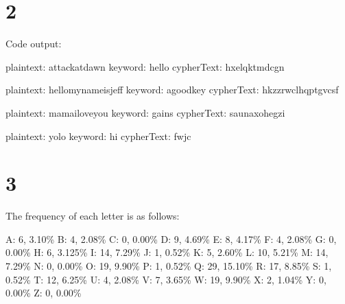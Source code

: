 \documentclass[a4paper]{article}
\begin{document}
\section*{2}



Code output:

plaintext: attackatdawn
keyword: hello
cypherText: hxelqktmdcgn

plaintext: hellomynameisjeff
keyword: agoodkey
cypherText: hkzzrwclhqptgvcsf

plaintext: mamailoveyou
keyword: gains
cypherText: saunaxohegzi

plaintext: yolo
keyword: hi
cypherText: fwjc


\section*{3}
The frequency of each letter is as follows:

A: 6, 3.10\%\newline
B: 4, 2.08\%\newline
C: 0, 0.00\%\newline
D: 9, 4.69\%\newline
E: 8, 4.17\%\newline
F: 4, 2.08\%\newline
G: 0, 0.00\%\newline
H: 6, 3.125\%\newline
I: 14, 7.29\%\newline
J: 1, 0.52\%\newline
K: 5, 2.60\%\newline
L: 10, 5.21\%\newline
M: 14, 7.29\%\newline
N: 0, 0.00\%\newline
O: 19, 9.90\%\newline
P: 1, 0.52\%\newline
Q: 29, 15.10\%\newline
R: 17, 8.85\%\newline
S: 1, 0.52\%\newline
T: 12, 6.25\%\newline
U: 4, 2.08\%\newline
V: 7, 3.65\%\newline
W: 19, 9.90\%\newline
X: 2, 1.04\%\newline
Y: 0, 0.00\%\newline
Z: 0, 0.00\%\newline
\end{document}
